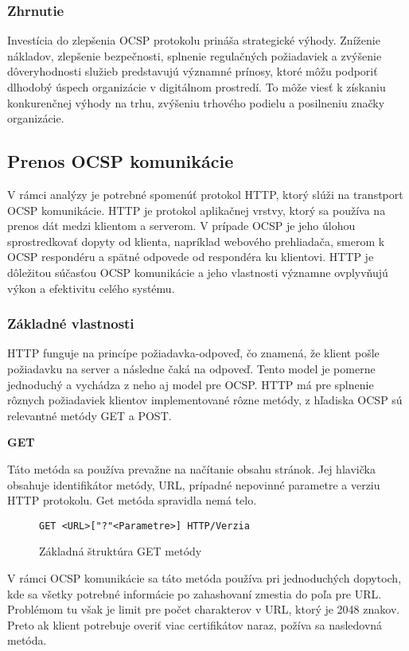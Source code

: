 \documentclass[12pt, twoside]{book}
\newcommand{\subsubsubsection}[1]{%
  \vspace{0.2em}  
  \textbf{#1} \\[0.2em]
  \hspace*{\parindent}
}
\begin{document}
\subsubsection{Zhrnutie}
Investícia do zlepšenia OCSP protokolu prináša strategické výhody. Zníženie nákladov, zlepšenie bezpečnosti, splnenie regulačných požiadaviek a zvýšenie dôveryhodnosti služieb predstavujú významné prínosy, ktoré môžu podporiť dlhodobý úspech organizácie v digitálnom prostredí. To môže viesť k získaniu konkurenčnej výhody na trhu, zvýšeniu trhového podielu a posilneniu značky organizácie.


\subsection{Prenos OCSP komunikácie}
V rámci analýzy je potrebné spomenúť protokol HTTP, ktorý slúži na transtport OCSP komunikácie.\cite{muni} HTTP je protokol aplikačnej vrstvy, ktorý sa používa na prenos dát medzi klientom a serverom. V prípade OCSP je jeho úlohou sprostredkovať dopyty od klienta, napríklad webového prehliadača, smerom k OCSP respondéru a spätné odpovede od respondéra ku klientovi. HTTP je dôležitou súčasťou OCSP komunikácie a jeho vlastnosti významne ovplyvňujú výkon a efektivitu celého systému.

\subsubsection{Základné vlastnosti}
HTTP funguje na princípe požiadavka-odpoveď, čo znamená, že klient pošle požiadavku na server a následne čaká na odpoveď. Tento model je pomerne jednoduchý a vychádza z neho aj model pre OCSP. HTTP má pre splnenie rôznych požiadaviek klientov implementované rôzne metódy, z hľadiska OCSP sú relevantné metódy GET a POST.\cite{rfc9110}

\subsubsubsection{GET}
Táto metóda sa používa prevažne na načítanie obsahu stránok. Jej hlavička obsahuje identifikátor metódy, URL, prípadné nepovinné parametre a verziu HTTP protokolu. Get metóda spravidla nemá telo.\cite{rfc9110}

\begin{figure}[H]
\begin{lstlisting}
GET <URL>["?"<Parametre>] HTTP/Verzia
\end{lstlisting}
\caption{Základná štruktúra GET metódy}
\end{figure}

V rámci OCSP komunikácie sa táto metóda používa pri jednoduchých dopytoch, kde sa všetky potrebné informácie po zahashovaní zmestia do poľa pre URL. Problémom tu však je limit pre počet charakterov v URL, ktorý je 2048 znakov. Preto ak klient potrebuje overiť viac certifikátov naraz, požíva sa nasledovná metóda.\cite{rfc6960}
\end{document}

